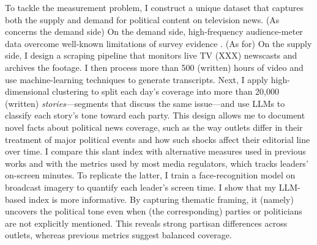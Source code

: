 \documentclass[12pt]{article}
\begin{document}
	
	To tackle the measurement problem, I construct a unique dataset that captures both the supply and demand for political content on television news. (As concerns the demand side) On the demand side, high-frequency audience-meter data overcome well-known limitations of survey evidence \citep{prior}. (As for) On the supply side, I design a scraping pipeline that monitors live TV (XXX) newscasts and archives the footage. I then process more than 500 (written) hours of video and use machine-learning techniques to generate transcripts. Next, I apply high-dimensional clustering to split each day’s coverage into more than 20,000 (written) \emph{stories}—segments that discuss the same issue—and use LLMs to classify each story’s tone toward each party.  This design allows me to document novel facts about political news coverage, such as the way outlets differ in their treatment of major political events and how such shocks affect their editorial line over time. I compare this slant index with alternative measures used in previous works and with the metrics used by most media regulators, which tracks leaders’ on-screen minutes. To replicate the latter, I train a face-recognition model on broadcast imagery to quantify each leader’s screen time. I show that my LLM-based index is more informative. By capturing thematic framing, it (namely) uncovers the political tone even when (the corresponding) parties or politicians are not explicitly mentioned. This reveals strong partisan differences across outlets, whereas previous metrics suggest balanced coverage.
	
	
	
	
	
\end{document}
